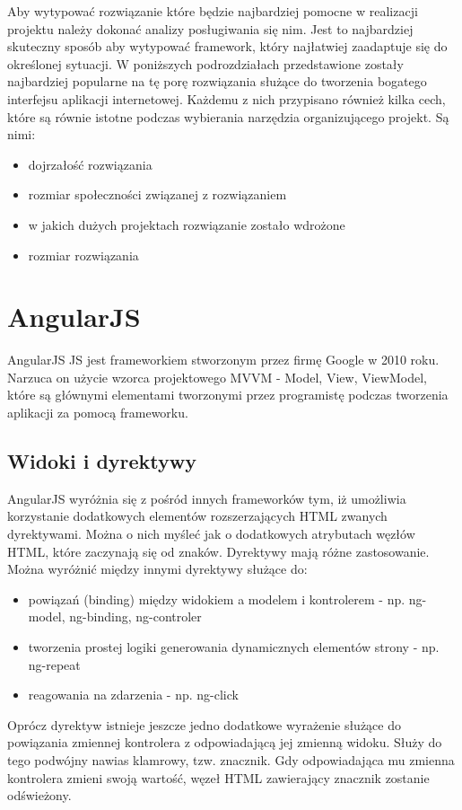 Aby wytypować rozwiązanie które będzie najbardziej pomocne w realizacji projektu należy dokonać analizy posługiwania się nim. Jest to najbardziej skuteczny sposób aby wytypować framework, który najłatwiej zaadaptuje się do określonej sytuacji. W poniższych podrozdziałach przedstawione zostały najbardziej popularne na tę porę rozwiązania służące do tworzenia bogatego interfejsu aplikacji internetowej. Każdemu z nich przypisano również kilka cech, które są równie istotne podczas wybierania narzędzia organizującego projekt. Są nimi:
\begin{itemize}
\item dojrzałość rozwiązania
\item rozmiar społeczności związanej z rozwiązaniem
\item w jakich dużych projektach rozwiązanie zostało wdrożone
\item rozmiar rozwiązania
\end{itemize}

\section{AngularJS}

AngularJS JS jest frameworkiem stworzonym przez firmę Google w 2010 roku. Narzuca on użycie wzorca projektowego MVVM - Model, View, ViewModel, które są głównymi elementami tworzonymi przez programistę podczas tworzenia aplikacji za pomocą frameworku. 

\subsection{Widoki i dyrektywy}
AngularJS wyróżnia się z pośród innych frameworków tym, iż umożliwia korzystanie dodatkowych elementów rozszerzających HTML zwanych dyrektywami. Można o nich myśleć jak o dodatkowych atrybutach węzłów HTML, które zaczynają się od znaków. Dyrektywy mają różne zastosowanie. Można wyróżnić między innymi dyrektywy służące do:
\begin{itemize}
\item powiązań (binding) między widokiem a modelem i kontrolerem - np. ng-model, ng-binding, ng-controler
\item tworzenia prostej logiki generowania dynamicznych elementów strony - np. ng-repeat
\item reagowania na zdarzenia - np. ng-click
\end{itemize}

Oprócz dyrektyw istnieje jeszcze jedno dodatkowe wyrażenie służące do powiązania zmiennej kontrolera z odpowiadającą jej zmienną widoku. Służy do tego podwójny nawias klamrowy, tzw. znacznik. Gdy odpowiadająca mu zmienna kontrolera zmieni swoją wartość, węzeł HTML zawierający znacznik zostanie odświeżony.

